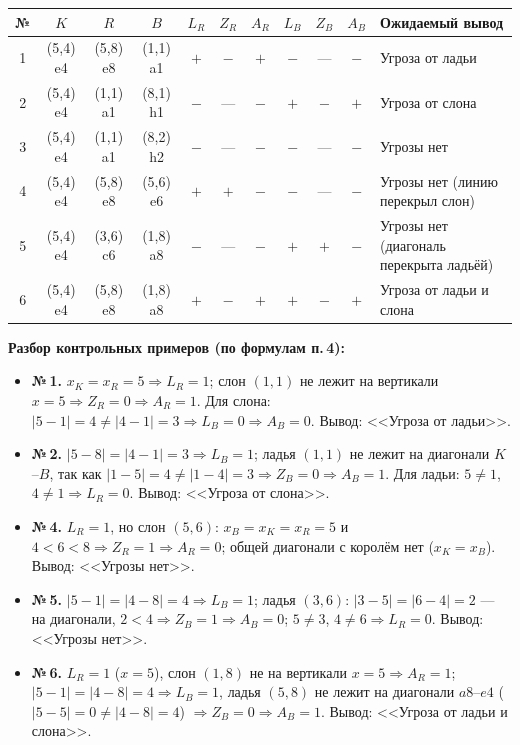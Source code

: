 \documentclass[12pt,a4paper]{article}
\begin{document}
\begin{center}
\small
\begin{tabular}{|c|c|c|c|c|c|c|c|c|c|p{4.2cm}|}
\hline
№ & $K$ & $R$ & $B$ & $L_R$ & $Z_R$ & $A_R$ & $L_B$ & $Z_B$ & $A_B$ & Ожидаемый вывод \\
\hline
1 & (5,4) e4 & (5,8) e8 & (1,1) a1 & $+$ & $-$ & $+$ & $-$ & --- & $-$ & Угроза от ладьи \\
\hline
2 & (5,4) e4 & (1,1) a1 & (8,1) h1 & $-$ & --- & $-$ & $+$ & $-$ & $+$ & Угроза от слона \\
\hline
3 & (5,4) e4 & (1,1) a1 & (8,2) h2 & $-$ & --- & $-$ & $-$ & --- & $-$ & Угрозы нет \\
\hline
4 & (5,4) e4 & (5,8) e8 & (5,6) e6 & $+$ & $+$ & $-$ & $-$ & --- & $-$ & Угрозы нет (линию перекрыл слон) \\
\hline
5 & (5,4) e4 & (3,6) c6 & (1,8) a8 & $-$ & --- & $-$ & $+$ & $+$ & $-$ & Угрозы нет (диагональ перекрыта ладьёй) \\
\hline
6 & (5,4) e4 & (5,8) e8 & (1,8) a8 & $+$ & $-$ & $+$ & $+$ & $-$ & $+$ & Угроза от ладьи и слона \\
\hline
\end{tabular}
\end{center}

\textbf{Разбор контрольных примеров (по формулам п.\,4):}
\begin{itemize}
  \item \textbf{№\,1.} $x_K = x_R = 5 \Rightarrow L_R = 1$; слон
        $(1,1)$ не лежит на вертикали $x=5 \Rightarrow Z_R = 0
        \Rightarrow A_R = 1$. Для слона: $|5-1| = 4 \neq |4-1| = 3
        \Rightarrow L_B = 0 \Rightarrow A_B = 0$. Вывод: <<Угроза
        от ладьи>>.
  \item \textbf{№\,2.} $|5-8| = |4-1| = 3 \Rightarrow L_B = 1$;
        ладья $(1,1)$ не лежит на диагонали $K$--$B$, так как
        $|1-5| = 4 \neq |1-4| = 3 \Rightarrow Z_B = 0
        \Rightarrow A_B = 1$. Для ладьи: $5 \neq 1$, $4 \neq 1
        \Rightarrow L_R = 0$. Вывод: <<Угроза от слона>>.
  \item \textbf{№\,4.} $L_R = 1$, но слон $(5,6)$: $x_B = x_K = x_R
        = 5$ и $4 < 6 < 8 \Rightarrow Z_R = 1 \Rightarrow A_R = 0$;
        общей диагонали с королём нет ($x_K = x_B$). Вывод:
        <<Угрозы нет>>.
  \item \textbf{№\,5.} $|5-1| = |4-8| = 4 \Rightarrow L_B = 1$;
        ладья $(3,6)$: $|3-5| = |6-4| = 2$ --- на диагонали, $2 < 4
        \Rightarrow Z_B = 1 \Rightarrow A_B = 0$; $5 \neq 3$,
        $4 \neq 6 \Rightarrow L_R = 0$. Вывод: <<Угрозы нет>>.
  \item \textbf{№\,6.} $L_R = 1$ ($x=5$), слон $(1,8)$ не на
        вертикали $x=5 \Rightarrow A_R = 1$; $|5-1| = |4-8| = 4
        \Rightarrow L_B = 1$, ладья $(5,8)$ не лежит на диагонали
        $a8$--$e4$ ($|5-5| = 0 \neq |4-8| = 4$) $\Rightarrow Z_B = 0
        \Rightarrow A_B = 1$. Вывод: <<Угроза от ладьи и слона>>.
\end{itemize}
\end{document}
